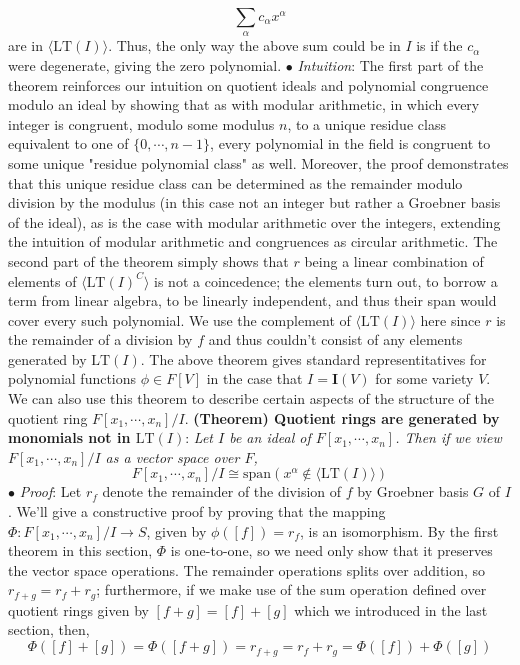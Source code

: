 \documentclass{article}
\newcommand*{\tb}{\textbf}
\newcommand*{\ti}{\textit}
\newcommand*{\n}{\newline}
\newcommand*{\nn}{\newline \newline}
\newcommand*{\Pf}{\indent \ensuremath{\bullet} \textit{Proof}: }
\newcommand*{\In}{\indent \ensuremath{\bullet} \textit{Intuition}: }
\newcommand*{\Fx}{\ensuremath{F[x_1, \cdots, x_n]}}
\newcommand*{\IV}{\ensuremath{\mathbf{I}(V)}}
\begin{document}
$$ \sum_\alpha c_\alpha x^\alpha $$
are in $ \langle \text{LT}(I) \rangle $. Thus, the only way the above sum could be in $ I $ is if the $ c_\alpha $ were degenerate, giving the zero polynomial. \qedsymbol
\n
\In The first part of the theorem reinforces our intuition on quotient ideals and polynomial congruence modulo an ideal by showing that as with modular arithmetic, in which every integer is congruent, modulo some modulus $ n $, to a unique residue class equivalent to one of $ \{ 0, \cdots, n - 1 \} $, every polynomial in the field is congruent to some unique "residue polynomial class" as well. Moreover, the proof demonstrates that this unique residue class can be determined as the remainder modulo division by the modulus (in this case not an integer but rather a Groebner basis of the ideal), as is the case with modular arithmetic over the integers, extending the intuition of modular arithmetic and congruences as circular arithmetic.
\n
The second part of the theorem simply shows that $ r $ being a linear combination of elements of $ \langle \text{LT}(I)^C \rangle $ is not a coincedence; the elements turn out, to borrow a term from linear algebra, to be linearly independent, and thus their span would cover every such polynomial. We use the complement of $ \langle \text{LT}(I) \rangle $ here since $ r $ is the remainder of a division by $ f $ and thus couldn't consist of any elements generated by $ \text{LT}(I) $.
\nn
The above theorem gives standard representitatives for polynomial functions $ \phi \in F[V] $ in the case that $ I = \IV $ for some variety $ V $. We can also use this theorem to describe certain aspects of the structure of the quotient ring $ \Fx / I $.
\nn
\tb{(Theorem) Quotient rings are generated by monomials not in $ \text{LT}(I) $}: \ti{Let $ I $ be an ideal of $ \Fx $. Then if we view $ \Fx / I $ as a vector space over $ F $,}
$$ \Fx / I \cong \text{span}(x^\alpha \not \in \langle \text{LT}(I) \rangle) $$
\Pf Let $ r_f $ denote the remainder of the division of $ f $ by Groebner basis $ G $ of $ I $. We'll give a constructive proof by proving that the mapping $ \Phi: \Fx / I \rightarrow S $, given by $ \phi([ f ]) = r_f $, is an isomorphism. By the first theorem in this section, $ \Phi $ is one-to-one, so we need only show that it preserves the vector space operations. The remainder operations splits over addition, so $ r_{f + g} = r_f + r_g $; furthermore, if we make use of the sum operation defined over quotient rings given by $ [ f + g ] = [ f ] + [ g ] $ which we introduced in the last section, then,
$$ \Phi([ f ] + [ g ]) = \Phi([ f + g ]) = r_{f + g} = r_f + r_g = \Phi([ f ]) + \Phi([ g ]) $$
\end{document}
